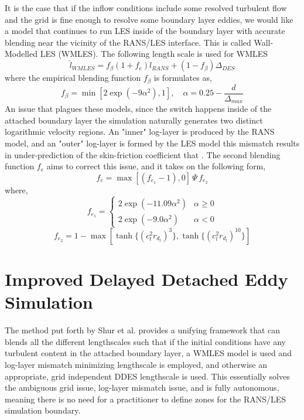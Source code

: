 \documentclass[12pt,letterpaper]{article}
\begin{document}
It is the case that if the inflow conditions include some resolved turbulent flow and the grid is fine enough to resolve some boundary layer eddies, we would like a model that continues to run LES inside of the boundary layer with accurate blending near the vicinity of the RANS/LES interface. This is called Wall-Modelled LES (WMLES). The following length scale is used for WMLES
\begin{equation}
    \hat{l}_{WMLES} = f_{\beta} (1 + f_{e}) l_{RANS} + (1 - f_{\beta}) \Delta_{DES}
\end{equation} 
where the empirical blending function $f_\beta$ is formulates as, 
\begin{equation}
    f_{\beta} = \min \left[ 2 \exp(-9\alpha^2), 1 \right], \quad \alpha = 0.25 - \frac{d}{\Delta_{max}}
\end{equation}
An issue that plagues these models, since the switch happens inside of the attached boundary layer the simulation naturally generates two distinct logarithmic velocity regions. An "inner" log-layer is produced by the RANS model, and an "outer" log-layer is formed by the LES model this mismatch results in under-prediction of the skin-friction coefficient that . The second blending function $f_e$ aims to correct this issue, and it takes on the following form, 
\begin{equation}
    f_{e} = \max [(f_{e_{1}} - 1), 0] \, \Psi \, f_{e_{2}}
\end{equation}
where, 
\begin{equation}
    f_{e_{1}} = \begin{cases} 2 \exp(-11.09 \alpha^2) & \alpha \geq 0 \\ 2 \exp(-9.0 \alpha^2) & \alpha < 0 \end{cases}
\end{equation}
\begin{equation}
    f_{e_{2}} = 1 - \max \left[ \tanh \{ (c_{t}^2 r_{d_{t}})^3 \}, \tanh \{ (c_{l}^2 r_{d_{l}})^{10} \} \right]
\end{equation}



\section{Improved Delayed Detached Eddy Simulation}
The method put forth by Shur et al. provides a unifying framework that can blends all the different lengthscales such that if the initial conditions have any turbulent content in the attached boundary layer, a WMLES model is used and log-layer mismatch minimizing lengthscale is employed, and otherwise an appropriate, grid independent DDES lengthscale is used. This essentially solves the ambiguous grid issue, log-layer mismatch issue, and is fully autonomous, meaning there is no need for a practitioner to define zones for the RANS/LES simulation boundary. 
\end{document}
